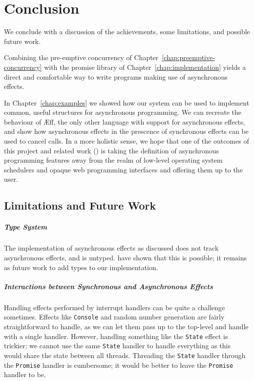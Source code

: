 \documentclass[msc,deptreport,cs]{infthesis} %
\newcommand{\code}[1]{\lstinline{#1}}
\newcommand\aeff{{\AE}ff\xspace}
\newcommand{\todo}[1]
           {{\par\noindent\small\color{RoyalPurple}
  \framebox{\parbox{\dimexpr\linewidth-2\fboxsep-2\fboxrule}
    {\textbf{TODO:} #1}}}}
\begin{document}
\chapter{Conclusion}
\label{chap:conclusion}

We conclude with a discussion of the achievements, some limitations, and
possible future work.

Combining the pre-emptive concurrency of
Chapter~\ref{chap:preemptive-concurrency} with the promise library of
Chapter~\ref{chap:implementation} yields a direct and comfortable way to write
programs making use of asynchronous effects.

In Chapter~\ref{chap:examples} we showed how our system can be used to implement
common, useful structures for asynchronous programming. We can recreate the
behaviour of \aeff, the only other language with support for asynchronous
effects, and show how asynchronous effects in the prescence of synchronous
effects can be used to cancel calls.
%
In a more holistic sense, we hope that one of the outcomes of this project and
related work (\cite{ahman2020asynchronous, leijen2017structured,
  dolan2017concurrent}) is taking the definition of asynchronous programming
features away from the realm of low-level operating system schedulers and opaque
web programming interfaces and offering them up to the user.



\section{Limitations and Future Work}

\paragraph*{Type System}
The implementation of asynchronous effects as discussed does not track
asynchronous effects, and is untyped. \citeauthor{ahman2020asynchronous} have
shown that this is possible; it remains as future work to add types to our
implementation.

\paragraph*{Interactions between Synchronous and Asynchronous Effects}
Handling effects performed by interrupt handlers can be quite a challenge
sometimes. Effects like \code{Console} and random number generation are fairly
straightforward to handle, as we can let them pass up to the top-level and
handle with a single handler. However, handling something like the \code{State}
effect is trickier; we cannot use the same \code{State} handler to handle
everything as this would share the state between all threads. Threading the
\code{State} handler through the \code{Promise} handler is cumbersome; it would
be better to leave the \code{Promise} handler to be.
\end{document}
